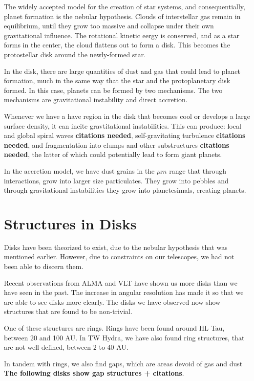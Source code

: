 \documentclass[onecolumn]{report}
\begin{document}
The widely accepted model for the creation of star systems, and consequentially, planet formation is the nebular hypothesis. Clouds of interstellar gas remain in equilibrium, until they grow too massive and collapse under their own gravitational influence. The rotational kinetic eergy is conserved, and as a star forms in the center, the cloud flattens out to form a disk. This becomes the protostellar disk around the newly-formed star.

In the disk, there are large quantities of dust and gas that could lead to planet formation, much in the same way that the star and the protoplanetary disk formed. In this case, planets can be formed by two mechanisms. The two mechanisms are gravitational instability and direct accretion.

Whenever we have a have region in the disk that becomes cool or develops a large surface density, it can incite gravtitational instabilities. This can produce: local and global spiral waves \textbf{citations needed}, self-gravitating turbulence \textbf{citations needed}, and fragmentation into clumps and other substructures \textbf{citations needed}, the latter of which could potentially lead to form giant planets.

In the accretion model, we have dust grains in the $\mu m$ range that through interactions, grow into larger size particulates. They grow into pebbles and through gravitational instabilities they grow into planetesimals, creating planets.

\section{Structures in Disks} %

Disks have been theorized to exist, due to the nebular hypothesis that was mentioned earlier. However, due to constraints on our telescopes, we had not been able to discern them.

Recent observations from ALMA and VLT have shown us more disks than we have seen in the past. The increase in angular resolution has made it so that we are able to see disks more clearly. The disks we have observed now show structures that are found to be non-trivial.

One of these structures are rings. Rings have been found around HL Tau, between 20 and 100 AU. In TW Hydra, we have also found ring structures, that are not well defined, between 2 to 40 AU.

In tandem with rings, we also find gaps, which are areas devoid of gas and dust \textbf{The following disks show gap structures + citations}.
\end{document}
